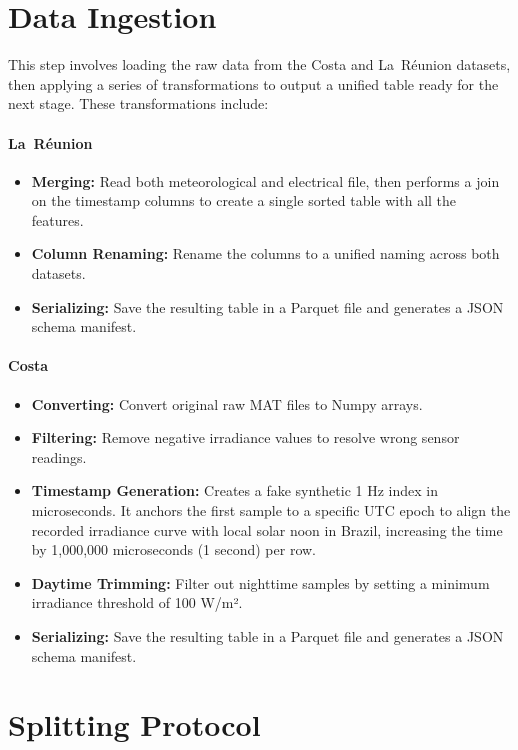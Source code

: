\section{Data Ingestion}
This step involves loading the raw data from the Costa and La~Réunion datasets, then applying a series of transformations to output a unified table ready for the next stage.
These transformations include:
\paragraph{La~Réunion} 
\begin{itemize}
    \item \textbf{Merging:} Read both meteorological and electrical file, then performs a join on the timestamp columns to create a single sorted table with all the features.
    \item \textbf{Column Renaming:} Rename the columns to a unified naming across both datasets.
    \item \textbf{Serializing:} Save the resulting table in a Parquet file and generates a JSON schema manifest. 
\end{itemize}
\paragraph{Costa}
\begin{itemize}
    \item \textbf{Converting:} Convert original raw MAT files to Numpy arrays.
    \item \textbf{Filtering:} Remove negative irradiance values to resolve wrong sensor readings.
    \item \textbf{Timestamp Generation:} Creates a fake synthetic 1 Hz index in microseconds. It anchors the first sample to a specific UTC epoch to align the recorded irradiance curve with local solar noon in Brazil, increasing the time by 1,000,000 microseconds (1 second) per row. 
    \item \textbf{Daytime Trimming:} Filter out nighttime samples by setting a minimum irradiance threshold of 100 W/m².
    \item \textbf{Serializing:} Save the resulting table in a Parquet file and generates a JSON schema manifest.
\end{itemize}

\section{Splitting Protocol}
\label{sec:implementation-splitting}


